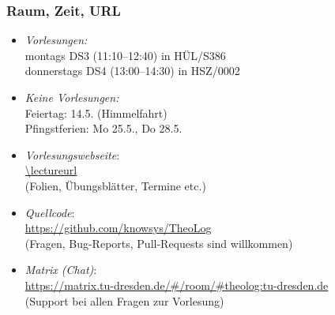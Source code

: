 \documentclass[aspectratio=1610,onlymath]{beamer}
\begin{document}
\maketitle



%
%

\begin{frame}\frametitle{Raum, Zeit, URL}

\begin{itemize}
\item \emph{Vorlesungen:}\\
	montags DS3 (11:10–12:40) in HÜL/S386\\
	donnerstags DS4 (13:00–14:30) in HSZ/0002
\item \emph{Keine Vorlesungen:}\\
	Feiertag: 14.5. (Himmelfahrt)\\
	Pfingstferien: Mo 25.5., Do 28.5.
\item \emph{Vorlesungswebseite}:\\[0.5ex]
	\url{\lectureurl}\\[0.5ex]
	(Folien, Übungsblätter, Termine etc.)
\item \emph{Quellcode}:\\[0.5ex]
	\url{https://github.com/knowsys/TheoLog}\\[0.5ex]
	(Fragen, Bug-Reports, Pull-Requests sind willkommen)
\item \emph{Matrix (Chat)}:\\[0.5ex]
	\url{https://matrix.tu-dresden.de/\#/room/\#theolog:tu-dresden.de}\\[0.5ex]
	(Support bei allen Fragen zur Vorlesung)
\end{itemize}

\end{frame}
\end{document}
